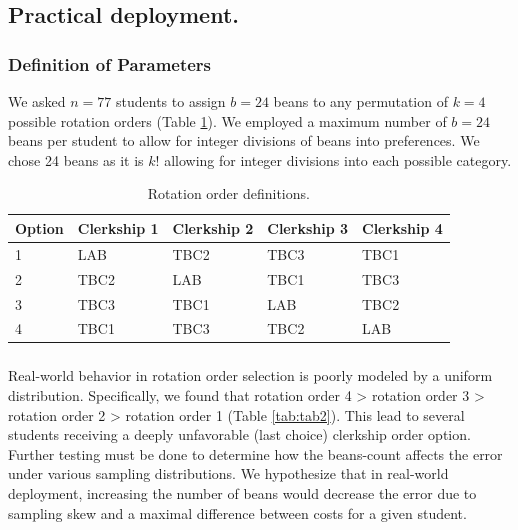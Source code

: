 \documentclass{article}
\begin{document}
\subsection{Practical deployment.}
\subsubsection{Definition of Parameters}
We asked $n = 77$ students to assign $b = 24$ beans to any permutation of $k = 4$ possible rotation orders (Table \ref{tab:tab1}). We employed a maximum number of $b = 24$ beans per student to allow for integer divisions of beans into preferences. We chose 24 beans as it is $k!$ allowing for integer divisions into each possible category. 

\begin{table}[h]
\centering
\begin{tabular}{@{}lllll@{}}
\toprule
Option & Clerkship 1 & Clerkship 2 & Clerkship 3 & Clerkship 4 \\ \midrule
1      & LAB         & TBC2        & TBC3        & TBC1        \\
2      & TBC2        & LAB         & TBC1        & TBC3        \\
3      & TBC3        & TBC1        & LAB         & TBC2        \\
4      & TBC1        & TBC3        & TBC2        & LAB         \\ \bottomrule
\end{tabular}
\caption{Rotation order definitions.}
\label{tab:tab1}
\end{table}

\subsubsection{}
Real-world behavior in rotation order selection is poorly modeled by a uniform distribution. Specifically, we found that rotation order 4 > rotation order 3 > rotation order 2 > rotation order 1 (Table \ref{tab:tab2}). This lead to several students receiving a deeply unfavorable (last choice) clerkship order option. Further testing must be done to determine how the beans-count affects the error under various sampling distributions. We hypothesize that in real-world deployment, increasing the number of beans would decrease the error due to sampling skew and a maximal difference between costs for a given student. 
\end{document}
